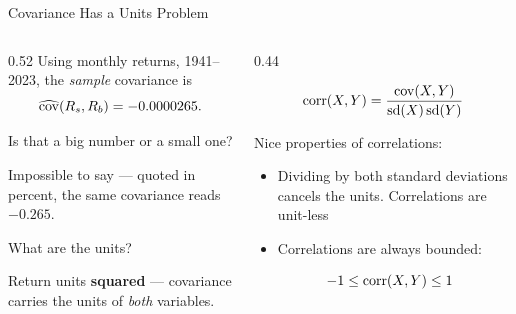 \documentclass[9pt,english,aspectratio=169]{beamer}
\begin{document}
\begin{frame}{Covariance Has a Units Problem}

  \begin{columns}[T]
    \begin{column}{0.52\textwidth}
      Using monthly returns, 1941–2023, the \textit{sample} covariance is
      \[
        \widehat{\operatorname{cov}}(R_s, R_b) = -0.0000265.
      \]
      \pause
      \vspace{-2em}
      {\footnotesize
      \begin{questionbox}
        Is that a big number or a small one?
      \end{questionbox}
      \pause
      \begin{answerbox}
        Impossible to say --- quoted in percent, the same covariance reads
        $-0.265$.
      \end{answerbox}
      \pause
      \begin{questionbox}
        What are the units?
      \end{questionbox}
      \pause
      \begin{answerbox}
        Return units \textbf{squared} --- covariance carries the units of
        \emph{both} variables.
      \end{answerbox}}
    \end{column}
    \begin{column}{0.44\textwidth}
      \vspace{1.5em}
      \pause
      \begin{definitionbox}[Correlation]
        \[
          \operatorname{corr}(X, Y) = \frac{\operatorname{cov}(X, Y)}{\text{sd}(X)\,\text{sd}(Y)}
        \]
      \end{definitionbox}
      \pause
      \vspace{1.2em}
      Nice properties of correlations:
      \vspace{0.5em}
      \begin{itemize}
        \item Dividing by both standard deviations cancels the units. Correlations are unit-less 
        \item Correlations are always bounded:
      \end{itemize}
        \[\quad -1 \leq \operatorname{corr}(X, Y) \leq 1\]


\end{column}
\end{columns}
\end{frame}
\end{document}
